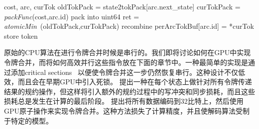 %


\begin{algorithm}[ht]
\caption{线程级别的令牌合并算法 \textcolor[rgb]{0,0.5,0}{(Inputs: accumulated cost, an out-going WFST arc and a current token)}}
\label{code:atomic}
\begin{algorithmic}[1]
 {cost, arc, curTok}
\State oldTokPack = state2tokPack[arc.next\_state]
\State curTokPack = \textit{packFunc}(cost,arc.id) \Comment \textcolor[rgb]{0,0.5,0}{pack into uint64}
\State ret = \textit{atomicMin}~\footnotemark(oldTokPack,curTokPack)
         \Comment \textcolor[rgb]{0,0.5,0}{recombine}
\State  perArcTokBuf[arc.id] = *curTok \Comment \textcolor[rgb]{0,0.5,0}{store token}
\EndIf
\EndProcedure
\end{algorithmic}
\end{algorithm}


原始的CPU算法在进行令牌合并时候是串行的。我们即将讨论如何在GPU中实现令牌合并，而将如何高效并行这些指令放在下面的章节中。一种最简单的实现是通过添加critical sections~\cite{lamport1979make}
以便使令牌合并这一步仍然恢复串行。这种设计不仅低效，而且会在早期GPU中引入死锁。
\cite{you2009parallel} 提出一种在每个状态上做针对所有令牌传递结果的规约操作，但这样将引入额外的规约过程中的写冲突和同步损耗，而且这些损耗总是发生在计算的最后阶段。
%
\cite{kim2011h} 提出将所有数据编码到32比特上，然后使用GPU原子操作来实现令牌合并。这种方法损失了计算精度，并且使解码算法受制于特定的模型。

